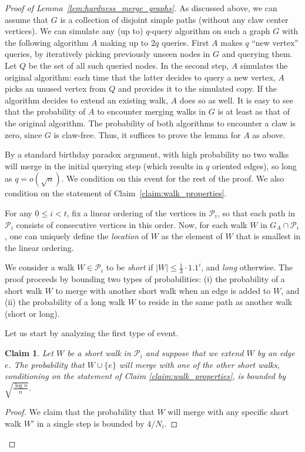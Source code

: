 \documentclass[11pt]{article}
\numberwithin{equation}{section}
\newtheorem{claim}[claim]{Claim}
\renewcommand{\P}{\mathcal{P}}
\newcommand{\1}{\mathbf{1}}
\begin{document}
\begin{proof}[Proof of Lemma~\ref{lem:hardness_merge_graphs}]
As discussed above, we can assume that $G$ is a collection of disjoint simple paths (without any claw center vertices). 
We can simulate any (up to) $q$-query algorithm on such a graph $G$ with the following algorithm $A$ making up to $2q$ queries. First $A$ makes $q$ ``new vertex'' queries, by iteratively picking previously unseen nodes in $G$ and querying them. Let $Q$ be the set of all such queried nodes.
In the second step, $A$ simulates the original algorithm: each time that the latter decides to query a new vertex, $A$ picks an unused vertex from $Q$ and provides it to the simulated copy. If the algorithm decides to extend an existing walk, $A$ does so as well. It is easy to see that the probability of $A$ to encounter merging walks in $G$ is at least as that of the original algorithm. The probability of both algorithms to encounter a claw is zero, since $G$ is claw-free. Thus, it suffices to prove the lemma for $A$ as above. 

By a standard birthday paradox argument, with high probability no two walks will merge in the initial querying step (which results in $q$ oriented edges), so long as $q = o(\sqrt{n})$. We condition on this event for the rest of the proof. We also condition on the statement of Claim~\ref{claim:walk_properties}. 

For any $0 \leq i < t$, fix a linear ordering of the vertices in $\P_i$, so that each path in $\P_i$ consists of consecutive vertices in this order. Now, for each walk $W$ in $G_A \cap \P_i$, one can uniquely define the \emph{location} of $W$ as the element of $W$ that is smallest in the linear ordering.

We consider a walk $W \in \P_i$ to be \emph{short} if $|W| \leq \frac{1}{3} \cdot 1.1^i$, and \emph{long} otherwise.
The proof proceeds by bounding two types of probabilities: (i) the probability of a short walk $W$ to merge with another short walk when an edge is added to $W$, and (ii) the probability of a long walk $W$ to reside in the same path as another walk (short or long). 

Let us start by analyzing the first type of event.
\begin{claim}
\label{claim:short-short-merge}
Let $W$ be a short walk in $\P_i$ and suppose that we extend $W$ by an edge $e$. The probability that $W \cup \{e\}$ will merge with one of the other short walks, conditioning on the statement of Claim \ref{claim:walk_properties}, is bounded by $\sqrt{\frac{\log n}{n}}$.
\end{claim}
\begin{proof}
We claim that the probability that $W$ will merge with any specific short walk $W'$ in a single step is bounded by $4/N_i$.


\end{proof}
\end{proof}
\end{document}
